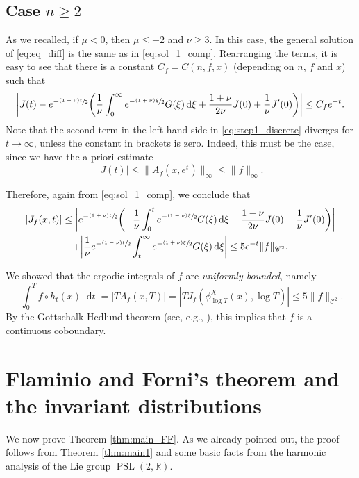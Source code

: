 \documentclass[11pt]{article}
\newcommand{\tpsfrac}[3]{\sfrac{(#1)#3}{#2}}
\newcommand \R{\mathbb{R}}
\newcommand*{\diff}{\mathop{}\!\mathrm{d}}
\newcommand{\aver}[1]{A_{#1}(x,T)}
\DeclareMathOperator{\PSL}{PSL}
\theoremstyle{definition}
\begin{document}
\subsection{Case $n\geq 2$}

As we recalled, if $\mu <0$, then $\mu \leq -2$ and $\nu \geq 3$.
In this case, the general solution of \eqref{eq:eq_diff} is the same as in \eqref{eq:sol_1_comp}.
Rearranging the terms, it is easy to see that there is a constant $C_f= C(n,f,x)$ (depending on $n$, $f$ and $x$) such that
\begin{equation}\label{eq:step1_discrete}
\biggl\lvert J(t) - e^{-\tpsfrac{1-\nu}{2}t} \biggl(\frac{1}{\nu} \int_0^{\infty} e^{-\tpsfrac{1+\nu}{2}\xi} G(\xi) \diff \xi + \frac{1+\nu}{2\nu} J(0) + \frac{1}{\nu}J'(0) \biggr) \biggr\rvert \leq C_f e^{-t}.
\end{equation}
Note that the second term in the left-hand side in \eqref{eq:step1_discrete} diverges for $t \to \infty$, unless the constant in brackets is zero.
Indeed, this must be the case, since we have the a priori estimate
\[
|J(t)|\leq \|A_f(x,e^t) \|_\infty \leq \|f\|_\infty.
\]

Therefore, again from \eqref{eq:sol_1_comp}, we conclude that
\begin{multline}\label{eq:estimate_discrete}
|J_{f}(x,t)|\leq \biggl\lvert e^{-\tpsfrac{1+\nu}{2}t} \biggl(- \frac{1}{\nu} \int_0^t e^{-\tpsfrac{1-\nu}{2}\xi} G(\xi) \diff \xi - \frac{1-\nu}{2\nu} J(0) - \frac{1}{\nu}J'(0) \biggr) \biggr\rvert \\
+ \biggl\lvert \frac{1}{\nu} e^{-\tpsfrac{1-\nu}{2}t} \int_t^{\infty} e^{-\tpsfrac{1+\nu}{2}\xi} G(\xi) \diff \xi \biggr\rvert
\leq 5e^{-t}\|f\|_{\mathscr{C}^2}.
\end{multline}

We showed that the ergodic integrals of $f$ are \emph{uniformly bounded}, namely
\[
\biggl\lvert \int_0^T f \circ h_t (x) \diff t \biggr\rvert = |T \aver{f}|= |T J_{f}(\phi^X_{\log T}(x), \log T)|\leq 5\|f\|_{\mathscr{C}^2}.
\]
By the Gottschalk-Hedlund theorem (see, e.g., \cite[Th.\,C]{McC}), this implies that $f$ is a continuous coboundary.

\section{Flaminio and Forni's theorem and the invariant distributions}\label{section:FF}

We now prove Theorem \ref{thm:main_FF}. As we already pointed out, the proof follows from Theorem \ref{thm:main1} and some basic facts from the harmonic analysis of the Lie group $\PSL(2,\R)$.
\end{document}
